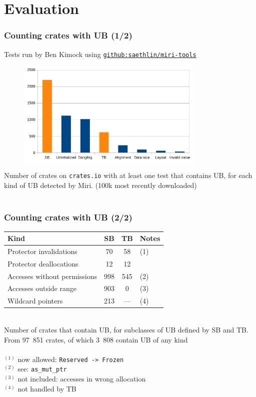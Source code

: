 \section{Evaluation}

\begin{frame}
    \frametitle{Counting crates with UB (1/2)}
    {\footnotesize
    Tests run by Ben Kimock using \href{https://github.com/saethlin/miri-tools}{\texttt{github:saethlin/miri-tools}}\\
    }
    \begin{figure}
        \includegraphics[width=0.8\textwidth]{../img/ub-count.png}
    \end{figure}
    {\footnotesize Number of crates on \texttt{crates.io} with at least one test
    that contains UB, for each kind of UB detected by Miri. (100k most recently downloaded)}\\~\\
\end{frame}

\begin{frame}
    \frametitle{Counting crates with UB (2/2)}
    \begin{tabular}{|l|c|c|l|}
        \hline
        Kind                         &  SB &  TB & Notes\\
        \hline
        Protector invalidations      &  70 &  58 & \tiny(1) \\
        Protector deallocations      &  12 &  12 & \\
        Accesses without permissions & 998 & 545 & \tiny(2) \\
        Accesses outside range       & 903 &   0 & \tiny(3) \\
        Wildcard pointers            & 213 & --- & \tiny(4) \\
        \hline
    \end{tabular}\\
    Number of crates that contain UB, for subclasses of UB defined by SB and TB.
    From 97~851 crates, of which 3~808 contain UB of any kind~\\~\\

    {\footnotesize
    \(^{(1)}\) now allowed: \texttt{Reserved -> Frozen}\\
    \(^{(2)}\) see: \texttt{as\_mut\_ptr}\\
    \(^{(3)}\) not included: accesses in wrong allocation\\
    \(^{(4)}\) not handled by TB\\
    }
\end{frame}

